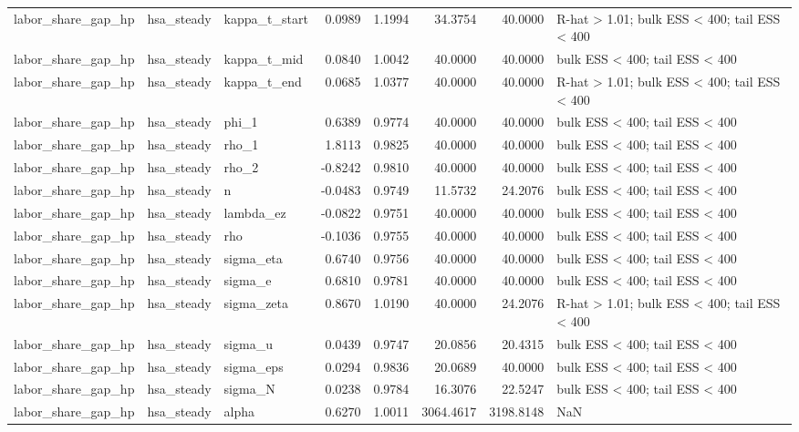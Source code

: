 \begin{tabular}{lllrrrrl}
labor\_share\_gap\_hp & hsa\_steady & kappa\_t\_start & 0.0989 & 1.1994 & 34.3754 & 40.0000 & R-hat > 1.01; bulk ESS < 400; tail ESS < 400 \\
labor\_share\_gap\_hp & hsa\_steady & kappa\_t\_mid & 0.0840 & 1.0042 & 40.0000 & 40.0000 & bulk ESS < 400; tail ESS < 400 \\
labor\_share\_gap\_hp & hsa\_steady & kappa\_t\_end & 0.0685 & 1.0377 & 40.0000 & 40.0000 & R-hat > 1.01; bulk ESS < 400; tail ESS < 400 \\
labor\_share\_gap\_hp & hsa\_steady & phi\_1 & 0.6389 & 0.9774 & 40.0000 & 40.0000 & bulk ESS < 400; tail ESS < 400 \\
labor\_share\_gap\_hp & hsa\_steady & rho\_1 & 1.8113 & 0.9825 & 40.0000 & 40.0000 & bulk ESS < 400; tail ESS < 400 \\
labor\_share\_gap\_hp & hsa\_steady & rho\_2 & -0.8242 & 0.9810 & 40.0000 & 40.0000 & bulk ESS < 400; tail ESS < 400 \\
labor\_share\_gap\_hp & hsa\_steady & n & -0.0483 & 0.9749 & 11.5732 & 24.2076 & bulk ESS < 400; tail ESS < 400 \\
labor\_share\_gap\_hp & hsa\_steady & lambda\_ez & -0.0822 & 0.9751 & 40.0000 & 40.0000 & bulk ESS < 400; tail ESS < 400 \\
labor\_share\_gap\_hp & hsa\_steady & rho & -0.1036 & 0.9755 & 40.0000 & 40.0000 & bulk ESS < 400; tail ESS < 400 \\
labor\_share\_gap\_hp & hsa\_steady & sigma\_eta & 0.6740 & 0.9756 & 40.0000 & 40.0000 & bulk ESS < 400; tail ESS < 400 \\
labor\_share\_gap\_hp & hsa\_steady & sigma\_e & 0.6810 & 0.9781 & 40.0000 & 40.0000 & bulk ESS < 400; tail ESS < 400 \\
labor\_share\_gap\_hp & hsa\_steady & sigma\_zeta & 0.8670 & 1.0190 & 40.0000 & 24.2076 & R-hat > 1.01; bulk ESS < 400; tail ESS < 400 \\
labor\_share\_gap\_hp & hsa\_steady & sigma\_u & 0.0439 & 0.9747 & 20.0856 & 20.4315 & bulk ESS < 400; tail ESS < 400 \\
labor\_share\_gap\_hp & hsa\_steady & sigma\_eps & 0.0294 & 0.9836 & 20.0689 & 40.0000 & bulk ESS < 400; tail ESS < 400 \\
labor\_share\_gap\_hp & hsa\_steady & sigma\_N & 0.0238 & 0.9784 & 16.3076 & 22.5247 & bulk ESS < 400; tail ESS < 400 \\
labor\_share\_gap\_hp & hsa\_steady & alpha & 0.6270 & 1.0011 & 3064.4617 & 3198.8148 & NaN \\

\end{tabular}
